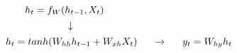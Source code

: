 \documentclass[]{article}
\begin{document}
\[h_t = f_W(h_{t-1}, X_t)\text{\phantom{aaaaaaaaaaaaaaa}}\]
\[\downarrow \text{\phantom{aaaaaaaaaaaa}}\]
\[\text{\phantom{aaaaaaa}}h_t = tanh(W_{hh}h_{t-1} + W_{xh}X_t) \text{\phantom{aaa}} \rightarrow \text{\phantom{aaa}} y_t = W_{hy}h_t\]
\end{document}
